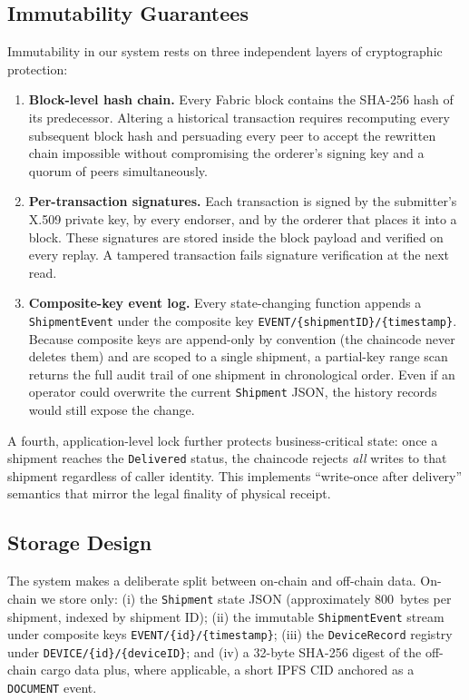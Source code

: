 \documentclass[conference]{IEEEtran}
\begin{document}
\subsection{Immutability Guarantees}
\label{sec:immutability}

Immutability in our system rests on three independent layers of
cryptographic protection:

\begin{enumerate}
  \item \textbf{Block-level hash chain.}  Every Fabric block contains the
    SHA-256 hash of its predecessor.  Altering a historical transaction
    requires recomputing every subsequent block hash and persuading every
    peer to accept the rewritten chain  impossible without compromising
    the orderer's signing key and a quorum of peers simultaneously.
  \item \textbf{Per-transaction signatures.}  Each transaction is signed
    by the submitter's X.509 private key, by every endorser, and by the
    orderer that places it into a block.  These signatures are stored
    inside the block payload and verified on every replay.  A tampered
    transaction fails signature verification at the next read.
  \item \textbf{Composite-key event log.}  Every state-changing function
    appends a \texttt{ShipmentEvent} under the composite key
    \texttt{EVENT/\{shipmentID\}/\{timestamp\}}.  Because composite keys
    are append-only by convention (the chaincode never deletes them) and
    are scoped to a single shipment, a partial-key range scan returns the
    full audit trail of one shipment in chronological order.  Even if an
    operator could overwrite the current \texttt{Shipment} JSON, the
    history records would still expose the change.
\end{enumerate}

A fourth, application-level lock further protects business-critical
state: once a shipment reaches the \texttt{Delivered} status, the
chaincode rejects \emph{all} writes to that shipment regardless of caller
identity.  This implements ``write-once after delivery'' semantics that
mirror the legal finality of physical receipt.

\subsection{Storage Design}
\label{sec:storage}

The system makes a deliberate split between on-chain and off-chain data.
On-chain we store only:
(i) the \texttt{Shipment} state JSON (approximately 800~bytes per
shipment, indexed by shipment ID);
(ii) the immutable \texttt{ShipmentEvent} stream under composite keys
\texttt{EVENT/\{id\}/\{timestamp\}};
(iii) the \texttt{DeviceRecord} registry under
\texttt{DEVICE/\{id\}/\{deviceID\}}; and
(iv) a 32-byte SHA-256 digest of the off-chain cargo data plus, where
applicable, a short IPFS CID anchored as a \texttt{DOCUMENT} event.
\end{document}
